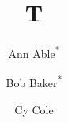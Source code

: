\documentclass{llncs}
\begin{document}
\title{T}
\author{Ann Able\textsuperscript{*} \and Bob Baker\textsuperscript{*} \and Cy Cole}
\maketitle
\end{document}
